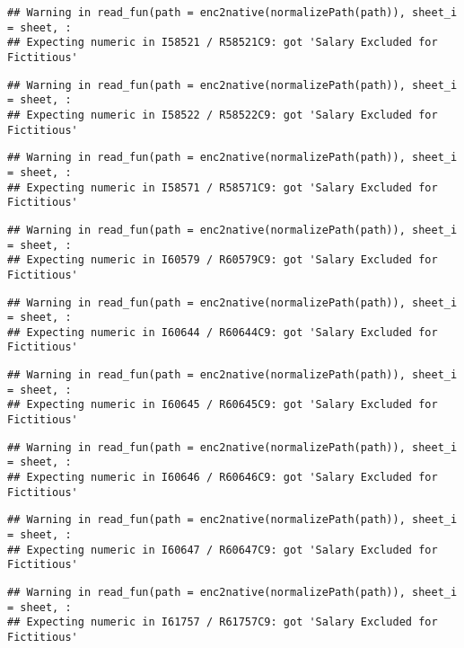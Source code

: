 \documentclass[
]{article}
\begin{document}
\begin{verbatim}
## Warning in read_fun(path = enc2native(normalizePath(path)), sheet_i = sheet, :
## Expecting numeric in I58521 / R58521C9: got 'Salary Excluded for Fictitious'
\end{verbatim}

\begin{verbatim}
## Warning in read_fun(path = enc2native(normalizePath(path)), sheet_i = sheet, :
## Expecting numeric in I58522 / R58522C9: got 'Salary Excluded for Fictitious'
\end{verbatim}

\begin{verbatim}
## Warning in read_fun(path = enc2native(normalizePath(path)), sheet_i = sheet, :
## Expecting numeric in I58571 / R58571C9: got 'Salary Excluded for Fictitious'
\end{verbatim}

\begin{verbatim}
## Warning in read_fun(path = enc2native(normalizePath(path)), sheet_i = sheet, :
## Expecting numeric in I60579 / R60579C9: got 'Salary Excluded for Fictitious'
\end{verbatim}

\begin{verbatim}
## Warning in read_fun(path = enc2native(normalizePath(path)), sheet_i = sheet, :
## Expecting numeric in I60644 / R60644C9: got 'Salary Excluded for Fictitious'
\end{verbatim}

\begin{verbatim}
## Warning in read_fun(path = enc2native(normalizePath(path)), sheet_i = sheet, :
## Expecting numeric in I60645 / R60645C9: got 'Salary Excluded for Fictitious'
\end{verbatim}

\begin{verbatim}
## Warning in read_fun(path = enc2native(normalizePath(path)), sheet_i = sheet, :
## Expecting numeric in I60646 / R60646C9: got 'Salary Excluded for Fictitious'
\end{verbatim}

\begin{verbatim}
## Warning in read_fun(path = enc2native(normalizePath(path)), sheet_i = sheet, :
## Expecting numeric in I60647 / R60647C9: got 'Salary Excluded for Fictitious'
\end{verbatim}

\begin{verbatim}
## Warning in read_fun(path = enc2native(normalizePath(path)), sheet_i = sheet, :
## Expecting numeric in I61757 / R61757C9: got 'Salary Excluded for Fictitious'
\end{verbatim}
\end{document}

